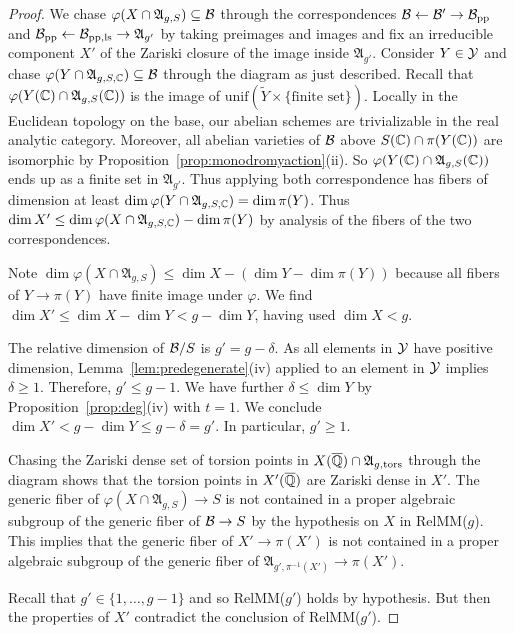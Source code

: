 \documentclass[12pt,oneside]{amsart}
\begin{document}
\begin{proof}
  We chase $\varphi(X\cap\mathfrak{A}_{g,S})\subseteq \mathcal{B}$
  through the  correspondences
  $\mathcal{B}\leftarrow \mathcal{B}'\rightarrow\mathcal{B}_{\mathrm{pp}}$ and $\mathcal{B}_{\mathrm{pp}}\leftarrow
  \mathcal{B}_{\mathrm{pp,ls}}\rightarrow
  \mathfrak{A}_{g'}$
  by taking preimages and images and fix an irreducible component $X'$ of the
  Zariski closure of the image inside $\mathfrak{A}_{g'}$.
  Consider $Y\in {\mathcal Y}$ and chase $\varphi(Y\cap\mathfrak{A}_{g,S,{\mathbb{C}}})\subseteq\mathcal{B}$
  through the diagram as just described. Recall that
  $\varphi(Y({\mathbb{C}})\cap\mathfrak{A}_{g,S}({\mathbb{C}}))$ is the image of
  $\mathrm{unif}(\tilde Y \times\{\text{finite set}\})$.
  Locally in the Euclidean topology on the base, our abelian schemes
  are trivializable in the real analytic category.
  Moreover, all abelian
  varieties of $\mathcal{B}$ above $S({\mathbb{C}})\cap\pi(Y({\mathbb{C}}))$ are isomorphic by
  Proposition~\ref{prop:monodromyaction}(ii). So
  $\varphi(Y({\mathbb{C}})\cap\mathfrak{A}_{g,S}({\mathbb{C}}))$ ends up
  as a finite set in $\mathfrak{A}_{g'}$. Thus applying both
  correspondence has
  fibers of dimension at least $\dim \varphi(Y\cap\mathfrak{A}_{g,S,{\mathbb{C}}})
  = \dim \pi(Y)$. 
  Thus $\dim X' \le \dim \varphi(X\cap \mathfrak{A}_{g,S,{\mathbb{C}}}) -
  \dim \pi(Y)$ by analysis of the fibers of the two correspondences.
  
  Note
  $\dim\varphi(X\cap \mathfrak{A}_{g,S}) \le \dim X - (\dim Y -
  \dim\pi(Y))$ because all fibers of $Y\rightarrow\pi(Y)$ have finite
  image under $\varphi$.
  We find $\dim X' \le \dim X
  - \dim Y < g -\dim Y$, having used $\dim X<g$.

  The relative dimension of
  $\mathcal{B}/S$ is $g'=g-\delta$. As all elements in ${\mathcal Y}$ have positive
  dimension, Lemma~\ref{lem:predegenerate}(iv) applied to an element
  in ${\mathcal Y}$ implies $\delta \ge 1$.
  Therefore, $g'\le g-1$. 
  We have further  $\delta \le \dim Y$  by Proposition~\ref{prop:deg}(iv) with
  $t=1$. We conclude $\dim X' < g-\dim Y \le g-\delta =g'$. In
  particular, $g'\ge 1$.


  Chasing the Zariski dense set of torsion points in $X({\overline{\mathbb{Q}}})\cap
  \mathfrak{A}_{g,\mathrm{tors}}$ through the  diagram shows that
  the torsion points in 
  $X'({\overline{\mathbb{Q}}})$ are Zariski dense in $X'$.
  The generic fiber of
  $\varphi(X\cap\mathfrak{A}_{g,S})\rightarrow S$ is
  not contained in a proper algebraic subgroup of the generic fiber of
  $\mathcal{B}\rightarrow S$ by the hypothesis on $X$ in RelMM($g$). This
  implies that the  generic fiber of $X'\rightarrow \pi(X')$ is not
  contained in a proper algebraic subgroup of the generic fiber of
  $\mathfrak{A}_{g',\pi^{-1}(X')}\rightarrow\pi(X')$.

  Recall  
  that $g' \in \{1,\ldots,g-1\}$ and so RelMM($g'$) holds by
  hypothesis. But then the properties of $X'$ contradict the
  conclusion of RelMM($g'$).   
\end{proof}
\end{document}
